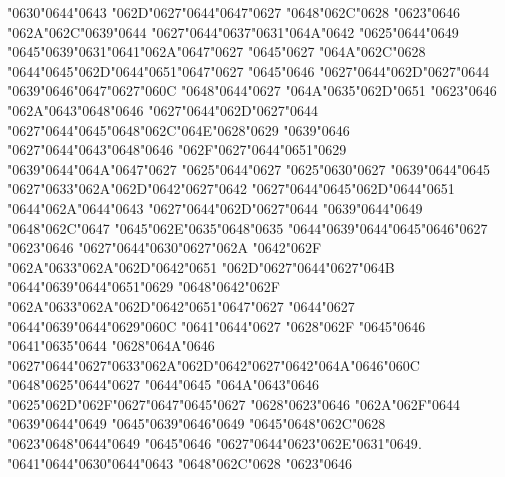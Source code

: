 {\char"0630}{\char"0644}{\char"0643} {\char"062D}{\char"0627}{\char"0644}{\char"0647}{\char"0627} {\char"0648}{\char"062C}{\char"0628} {\char"0623}{\char"0646} {\char"062A}{\char"062C}{\char"0639}{\char"0644} {\char"0627}{\char"0644}{\char"0637}{\char"0631}{\char"064A}{\char"0642} {\char"0625}{\char"0644}{\char"0649} {\char"0645}{\char"0639}{\char"0631}{\char"0641}{\char"062A}{\char"0647}{\char"0627} {\char"0645}{\char"0627} {\char"064A}{\char"062C}{\char"0628} {\char"0644}{\char"0645}{\char"062D}{\char"0644}{\char"0651}{\char"0647}{\char"0627} {\char"0645}{\char"0646} {\char"0627}{\char"0644}{\char"062D}{\char"0627}{\char"0644} {\char"0639}{\char"0646}{\char"0647}{\char"0627}{\char"060C} {\char"0648}{\char"0644}{\char"0627} {\char"064A}{\char"0635}{\char"062D}{\char"0651} {\char"0623}{\char"0646} {\char"062A}{\char"0643}{\char"0648}{\char"0646} {\char"0627}{\char"0644}{\char"062D}{\char"0627}{\char"0644} {\char"0627}{\char"0644}{\char"0645}{\char"0648}{\char"062C}{\char"064E}{\char"0628}{\char"0629} {\char"0639}{\char"0646} {\char"0627}{\char"0644}{\char"0643}{\char"0648}{\char"0646} {\char"062F}{\char"0627}{\char"0644}{\char"0651}{\char"0629} {\char"0639}{\char"0644}{\char"064A}{\char"0647}{\char"0627} {\char"0625}{\char"0644}{\char"0627} {\char"0625}{\char"0630}{\char"0627} {\char"0639}{\char"0644}{\char"0645} {\char"0627}{\char"0633}{\char"062A}{\char"062D}{\char"0642}{\char"0627}{\char"0642} {\char"0627}{\char"0644}{\char"0645}{\char"062D}{\char"0644}{\char"0651} {\char"0644}{\char"062A}{\char"0644}{\char"0643} {\char"0627}{\char"0644}{\char"062D}{\char"0627}{\char"0644} {\char"0639}{\char"0644}{\char"0649} {\char"0648}{\char"062C}{\char"0647} {\char"0645}{\char"062E}{\char"0635}{\char"0648}{\char"0635} {\char"0644}{\char"0639}{\char"0644}{\char"0645}{\char"0646}{\char"0627} {\char"0623}{\char"0646} {\char"0627}{\char"0644}{\char"0630}{\char"0627}{\char"062A} {\char"0642}{\char"062F} {\char"062A}{\char"0633}{\char"062A}{\char"062D}{\char"0642}{\char"0651} {\char"062D}{\char"0627}{\char"0644}{\char"0627}{\char"064B} {\char"0644}{\char"0639}{\char"0644}{\char"0651}{\char"0629} {\char"0648}{\char"0642}{\char"062F} {\char"062A}{\char"0633}{\char"062A}{\char"062D}{\char"0642}{\char"0651}{\char"0647}{\char"0627} {\char"0644}{\char"0627} {\char"0644}{\char"0639}{\char"0644}{\char"0629}{\char"060C} {\char"0641}{\char"0644}{\char"0627} {\char"0628}{\char"062F} {\char"0645}{\char"0646} {\char"0641}{\char"0635}{\char"0644} {\char"0628}{\char"064A}{\char"0646} {\char"0627}{\char"0644}{\char"0627}{\char"0633}{\char"062A}{\char"062D}{\char"0642}{\char"0627}{\char"0642}{\char"064A}{\char"0646}{\char"060C} {\char"0648}{\char"0625}{\char"0644}{\char"0627} {\char"0644}{\char"0645} {\char"064A}{\char"0643}{\char"0646} {\char"0625}{\char"062D}{\char"062F}{\char"0627}{\char"0647}{\char"0645}{\char"0627} {\char"0628}{\char"0623}{\char"0646} {\char"062A}{\char"062F}{\char"0644} {\char"0639}{\char"0644}{\char"0649} {\char"0645}{\char"0639}{\char"0646}{\char"0649} {\char"0645}{\char"0648}{\char"062C}{\char"0628} {\char"0623}{\char"0648}{\char"0644}{\char"0649} {\char"0645}{\char"0646} {\char"0627}{\char"0644}{\char"0623}{\char"062E}{\char"0631}{\char"0649}. {\char"0641}{\char"0644}{\char"0630}{\char"0644}{\char"0643} {\char"0648}{\char"062C}{\char"0628} {\char"0623}{\char"0646} 